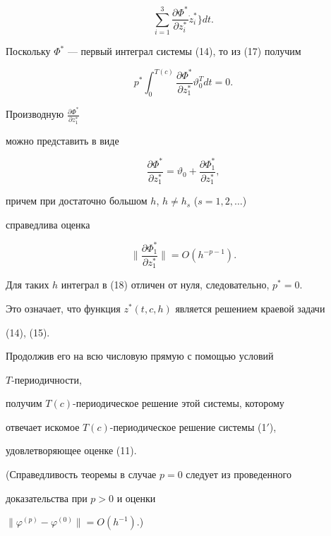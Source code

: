 \begin{pf}
\begin{equation}
\sum^3_{i=1}\frac{\partial\Phi^*}{\partial z^*_i}\Dot z^*_i 


\biggr\}dt. 


\end{equation} 


Поскольку $\Phi^*$ --- первый интеграл системы (14), то из (17) получим 


\begin{equation} 


p^*\int^{T(c)}_0\frac{\partial\Phi^*}{\partial z^*_1} 


\vartheta^T_0 dt=0. 


\end{equation} 


Производную $\frac{\partial\Phi^*}{\partial z^*_1}$ 


можно представить в виде 


$$ 


\frac{\partial\Phi^*}{\partial z^*_1}=\vartheta_0+ 


\frac{\partial\Phi^*_1}{\partial z^*_1}, 


$$ 


причем при достаточно большом $h$, $h\ne h_s$ ($s=1,2,\dotsc$) 


справедлива оценка 


$$ 


\biggl\|\frac{\partial\Phi^*_1}{\partial z^*_1}\biggr\|= 


O(h^{-p-1}). 


$$ 


Для таких $h$ интеграл в (18) отличен от нуля, следовательно, $p^*=0$. 


Это означает, что функция $z^*(t,c,h)$ является решением краевой задачи 


(14), (15). 


Продолжив его на всю числовую прямую с помощью условий 


$T$-периодичности, 


получим $T(c)$-периодическое решение этой системы, которому 


отвечает искомое $T(c)$-периодическое решение системы (1${}'$), 


удовлетворяющее оценке (11). 


 


(Справедливость теоремы в случае $p=0$ следует из проведенного 


доказательства при $p>0$ и оценки 


$\|\varphi^{(p)}-\varphi^{(0)}\|=O(h^{-1})$.) 


\end{pf} 


